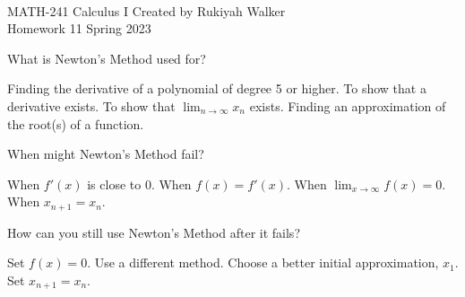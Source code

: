 \documentclass[addpoints, 12pt]{exam}%
\begin{document}
\noindent \hrulefill \\
	MATH-241 Calculus I \hfill Created by Rukiyah Walker\\
	Homework 11 \hfill Spring 2023\\ \vspace*{-1cm}
 
	\noindent\hrulefill


\begin{questions}

\vspace*{0.5cm}

\question[1]

What is Newton's Method used for?

\begin{multicols}{2}
\begin{choices}
\choice Finding the derivative of a polynomial of degree 5 or higher.
\choice To show that a derivative exists.
\choice To show that $\lim_{n \to \infty} x_n$ exists.
\CorrectChoice Finding an approximation of the root(s) of a function.
\end{choices}  
\end{multicols}

\question[1]

When might Newton's Method fail?

\begin{multicols}{2}
\begin{choices}
\CorrectChoice When $f'(x)$ is close to 0.
\choice When $f(x) = f'(x)$.
\choice When $\lim_{x \to \infty} f(x) = 0$.
\choice When $x_{n+1} = x_n$.
\end{choices}
\end{multicols}

\question[1]

How can you still use Newton's Method after it fails?

\begin{multicols}{2}
\begin{choices}
\choice Set $f(x) = 0$.
\choice Use a different method.
\CorrectChoice Choose a better initial approximation, $x_1$.
\choice Set $x_{n+1} = x_n$.
\end{choices} 
\end{multicols}


\end{questions}
\end{document}
